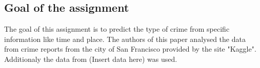 \documentclass[../Main.tex]{subfiles}
\begin{document}
\subsection{Goal of the assignment}
The goal of this assignment is to predict the type of crime from specific information like time and place.
The authors of this paper analysed the data from crime reports from the city of San Francisco provided by the site "Kaggle". Additionaly the data from (Insert data here) was used.
\end{document}
